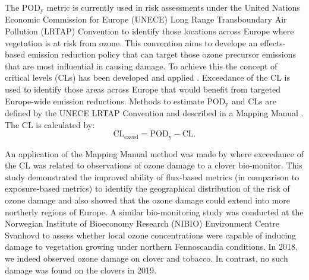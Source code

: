 \documentclass[bg, manuscript]{copernicus}
\begin{document}
The $\mathrm{POD_y}$ metric is currently used in risk assessments under the United Nations Economic Commission for Europe (UNECE) Long Range Transboundary Air Pollution (LRTAP) Convention to identify those locations across Europe where vegetation is at risk from ozone. This convention aims to develope an effects-based emission reduction policy that can target those ozone precursor emissions that are most influential in causing damage. To achieve this the concept of critical levels (CLs) has been developed and applied \citep{Maas2016}. Exceedance of the CL is used to identify those areas across Europe that would benefit from targeted Europe-wide emission reductions. Methods to estimate $\mathrm{POD_y}$ and CLs are defined by the UNECE LRTAP Convention and described in a Mapping Manual \citep{ICP:MappingManual2017}. The CL is calculated by: 
%
\begin{equation}
  \mathrm{CL_{exeed}} = \mathrm{POD_y} - \mathrm{CL}.
\end{equation}
%

An application of the Mapping Manual method was made by \citet{GCB:Mills2011} where exceedance of the CL was related to observations of ozone damage to a clover bio-monitor. This study demonstrated the improved ability of flux-based metrics (in comparison to exposure-based metrics) to identify the geographical distribution of the risk of ozone damage and also showed that the ozone damage could extend into more northerly regions of Europe. A similar bio-monitoring study was conducted at the Norwegian Institute of Bioeconomy Research (NIBIO) Environment Centre Svanhovd to assess whether local ozone concentrations were capable of inducing damage to vegetation growing under northern Fennoscandia conditions. In 2018, we indeed observed ozone damage on clover and tobacco. In contrast, no such damage was found on the clovers in 2019.
\end{document}

